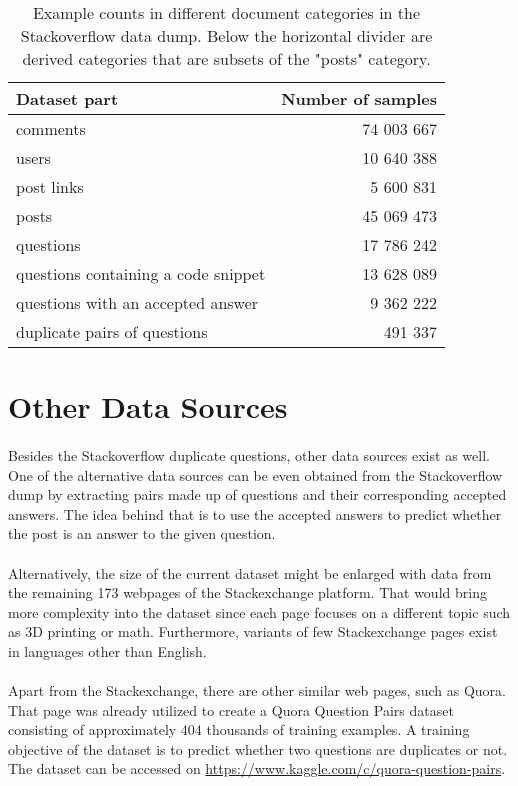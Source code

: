 \begin{table}[h!]
	\begin{center}
		\begin{tabular}{l r} 
			\hline
			\textbf{Dataset part} & \textbf{Number of samples} \\ [0.5ex] 
			\hline\hline
			comments & 74 003 667 \\ 
			users & 10 640 388 \\ 
			post links & 5 600 831 \\ 
			posts & 45 069 473 \\
			\hline
			questions & 17 786 242 \\
			questions containing a code snippet & 13 628 089 \\
			questions with an accepted answer & 9 362 222 \\
			duplicate pairs of questions & 491 337 \\
			\hline
		\end{tabular}
	\end{center}
	\caption{Example counts in different document categories in the Stackoverflow data dump. Below the horizontal divider are derived categories that are subsets of the "posts" category.}
	\label{data_source_counts_analysis}
\end{table}

\section{Other Data Sources}
\paragraph{}
Besides the Stackoverflow duplicate questions, other data sources exist as well. One of the alternative data sources can be even obtained from the Stackoverflow dump by extracting pairs made up of questions and their corresponding accepted answers. The idea behind that is to use the accepted answers to predict whether the post is an answer to the given question.

\paragraph{}
Alternatively, the size of the current dataset might be enlarged with data from the remaining 173 webpages of the Stackexchange platform. That would bring more complexity into the dataset since each page focuses on a different topic such as 3D printing or math. Furthermore, variants of few Stackexchange pages exist in languages other than English.

\paragraph{}
Apart from the Stackexchange, there are other similar web pages, such as Quora. That page was already utilized to create a Quora Question Pairs dataset consisting of approximately 404 thousands of training examples. A training objective of the dataset is to predict whether two questions are duplicates or not. The dataset can be accessed on \url{https://www.kaggle.com/c/quora-question-pairs}.